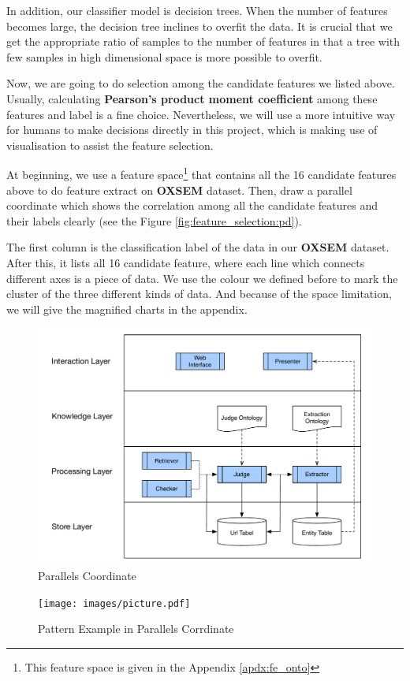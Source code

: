 In addition, our classifier model is decision trees. When the number of features becomes large, the decision tree inclines to overfit the data. It is crucial that we get the appropriate ratio of samples to the number of features in that a tree with few samples in high dimensional space is more possible to overfit. 

Now, we are going to do selection among the candidate features we listed above. Usually, calculating \textbf{Pearson's product moment coefficient} among these features and label is a fine choice\cite{lee1988thirteen}. Nevertheless, we will use a more intuitive way for humans to make decisions directly in this project, which is making use of visualisation to assist the feature selection.

At beginning, we use a feature space\footnote{This feature space is given in the Appendix \ref{apdx:fe_onto} } that contains all the 16 candidate features above to do feature extract on \textbf{OXSEM} dataset. Then, draw a parallel coordinate which shows the correlation among all the candidate features and their labels clearly (see the Figure \ref{fig:feature_selection:pd}).

The first column is the classification label of the data in our \textbf{OXSEM} dataset. After this, it lists all 16 candidate feature, where each line which connects different axes is a piece of data. We use the colour we defined before to mark the cluster of the three different kinds of data. And because of the space limitation, we will give the magnified charts in the appendix.

\begin{figure}[htb!]
	\centering
	\includegraphics[page=11,width=\textwidth]{images/diagrams.pdf}
	\caption{Parallels Coordinate}\label{fig:feature_selection:pd_pattern}
\end{figure}
\begin{figure}[htb!]
	\centering
	\texttt{[image: images/picture.pdf]}
	\caption{Pattern Example in Parallels Corrdinate}\label{fig:feature_selection:pd_exp}
\end{figure}


